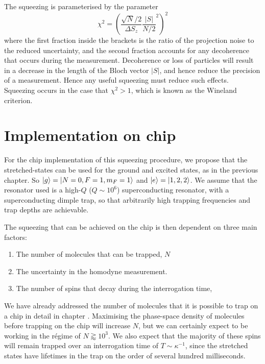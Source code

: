 The squeezing is parameterised by the parameter~\cite{PhysRevA.46.R6797}
%
\begin{equation}
  \chi^2 = \left(\frac{\sqrt{N}/2}{\Delta S_z}\frac{|S|}{N/2}^2\right)^2
\end{equation}
%
where the first fraction inside the brackets is the ratio of the projection
noise to the reduced uncertainty, and the second fraction accounts for any
decoherence that occurs during the measurement. Decoherence or loss of
particles will result in a decrease in the length of the Bloch vector $|S|$,
and hence reduce the precision of a measurement. Hence any useful squeezing
must reduce such effects. Squeezing occurs in the case that $\chi^2 >1$, which
is known as the Wineland criterion.

\section{Implementation on \CaF{} chip}

For the \CaF{} chip implementation of this squeezing procedure, we propose that
the stretched-states can be used for the ground and excited states, as in the
previous chapter. So $\ket{g} = \ket{N=0, F=1, m_F=1}$ and $\ket{e} =
\ket{1, 2, 2}$. We assume that the resonator used is a high-$Q$ ($Q\sim10^6$)
superconducting resonator, with a superconducting dimple trap, so that
arbitrarily high trapping frequencies and trap depths are achievable.
%

The squeezing that can be achieved on the chip is then dependent on three main
factors:
%
\begin{enumerate}
    \item The number of molecules that can be trapped, $N$
    \item The uncertainty in the homodyne measurement.
    \item The number of spins that decay during the interrogation time,
\end{enumerate}

We have already addressed the number of molecules that it is possible to trap
on a chip in detail in chapter . Maximising the phase-space
density of molecules before trapping on the chip will increase $N$, but we can
certainly expect to be working in the r\'egime of $N\gtrapprox10^3$. We also
expect that the majority of these spins will remain trapped over an
interrogation time of $T\sim\kappa^{-1}$, since the stretched states have
lifetimes in the trap on the order of several hundred milliseconds.

